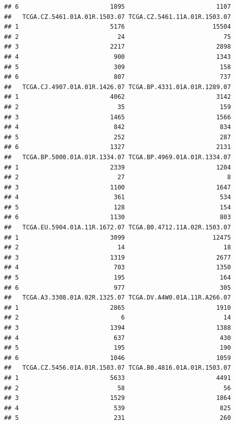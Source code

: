 \documentclass[
]{article}
\begin{document}
\begin{verbatim}
## 6                         1895                         1107
##   TCGA.CZ.5461.01A.01R.1503.07 TCGA.CZ.5461.11A.01R.1503.07
## 1                         5176                        15504
## 2                           24                           75
## 3                         2217                         2898
## 4                          900                         1343
## 5                          309                          158
## 6                          807                          737
##   TCGA.CJ.4907.01A.01R.1426.07 TCGA.BP.4331.01A.01R.1289.07
## 1                         4062                         3142
## 2                           35                          159
## 3                         1465                         1566
## 4                          842                          834
## 5                          252                          287
## 6                         1327                         2131
##   TCGA.BP.5000.01A.01R.1334.07 TCGA.BP.4969.01A.01R.1334.07
## 1                         2339                         1204
## 2                           27                            8
## 3                         1100                         1647
## 4                          361                          534
## 5                          128                          154
## 6                         1130                          803
##   TCGA.EU.5904.01A.11R.1672.07 TCGA.B0.4712.11A.02R.1503.07
## 1                         3099                        12475
## 2                           14                           18
## 3                         1319                         2677
## 4                          703                         1350
## 5                          195                          164
## 6                          977                          305
##   TCGA.A3.3308.01A.02R.1325.07 TCGA.DV.A4W0.01A.11R.A266.07
## 1                         2865                         1910
## 2                            6                           14
## 3                         1394                         1388
## 4                          637                          430
## 5                          195                          190
## 6                         1046                         1059
##   TCGA.CZ.5456.01A.01R.1503.07 TCGA.B0.4816.01A.01R.1503.07
## 1                         5633                         4491
## 2                           58                           56
## 3                         1529                         1864
## 4                          539                          825
## 5                          231                          260

\end{verbatim}
\end{document}
